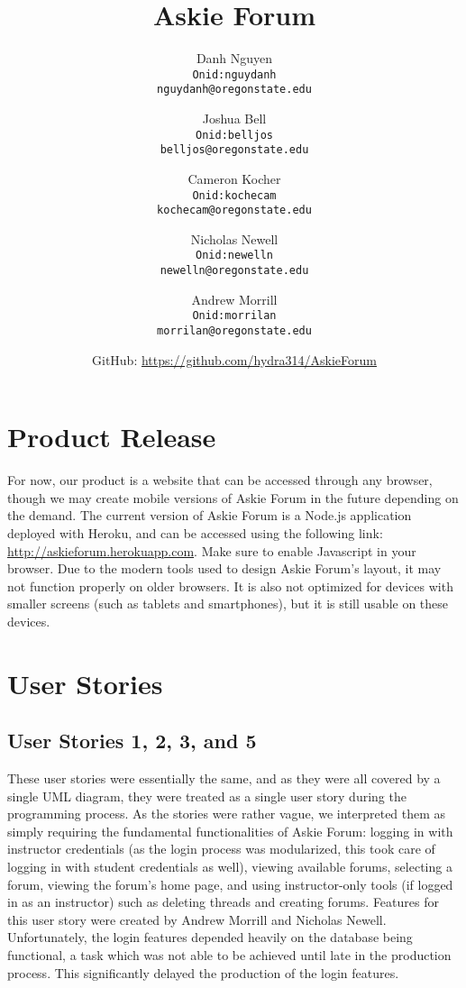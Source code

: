 \documentclass[12pt]{article}
\title{Askie Forum}
\author{
         Danh Nguyen\\
         \texttt{Onid:nguydanh}\\
         \texttt{nguydanh@oregonstate.edu}
         \and
         Joshua Bell\\
         \texttt{Onid:belljos}\\
         \texttt{belljos@oregonstate.edu}
         \and
         Cameron Kocher\\
         \texttt{Onid:kochecam}\\
         \texttt{kochecam@oregonstate.edu}
         \and
         Nicholas Newell\\
         \texttt{Onid:newelln}\\
         \texttt{newelln@oregonstate.edu}
         \and
         Andrew Morrill\\
         \texttt{Onid:morrilan}\\
         \texttt{morrilan@oregonstate.edu}
         \and
         GitHub: \url{https://github.com/hydra314/AskieForum}
    }
\begin{document}
\maketitle

\tableofcontents
\newpage
\section{Product Release}

\begin{flushleft}
For now, our product is a website that can be accessed through any browser, though we may create mobile versions of Askie Forum in the future depending on the demand. The current version of Askie Forum is a Node.js application deployed with Heroku, and can be accessed using the following link: \url{http://askieforum.herokuapp.com}. Make sure to enable Javascript in your browser. Due to the modern tools used to design Askie Forum's layout, it may not function properly on older browsers. It is also not optimized for devices with smaller screens (such as tablets and smartphones), but it is still usable on these devices.
\end{flushleft}

\section{User Stories}

\subsection{User Stories 1, 2, 3, and 5}
\begin{flushleft}
These user stories were essentially the same, and as they were all covered by a single UML diagram, they were treated as a single user story during the programming process. As the stories were rather vague, we interpreted them as simply requiring the fundamental functionalities of Askie Forum: logging in with instructor credentials (as the login process was modularized, this took care of logging in with student credentials as well), viewing available forums, selecting a forum, viewing the forum's home page, and using instructor-only tools (if logged in as an instructor) such as deleting threads and creating forums. Features for this user story were created by Andrew Morrill and Nicholas Newell. Unfortunately, the login features depended heavily on the database being functional, a task which was not able to be achieved until late in the production process. This significantly delayed the production of the login features.
\end{flushleft}
\end{document}
